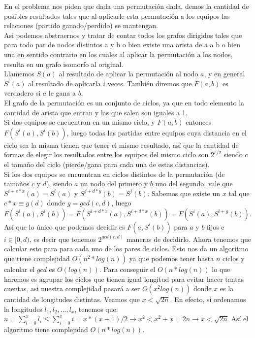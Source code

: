 \documentclass[a4paper]{article}
\begin{document}
En el problema nos piden que dada una permutaci\'on dada, demos la cantidad de posibles resultados tales que al aplicarle esta permutaci\'on a los equipos las relaciones (partido ganado/perdido) se mantengan.\\
Asi podemos abstraernos y tratar de contar todos los grafos dirigidos tales que para todo par de nodos distintos a y b o bien existe una arista de a a b o bien una en sentido contrario en los cuales al aplicar la permutaci\'on a los nodos, resulta en un grafo isomorfo al original.\\
Llamemos $S(a)$ al resultado de aplicar la permutaci\'on al nodo $a$, y en general $S^i(a)$ al resultado de aplicarla $i$ veces. Tambi\'en diremos que $F(a,b)$ es verdadero si $a$ le gana a $b$.\\
El grafo de la permutaci\'on es un conjunto de ciclos, ya que en todo elemento la cantidad de arista que entran y las que salen son iguales a 1.\\
Si dos equipos se encuentran en un mismo ciclo, y $F(a, b)$ entonces $F(S^i(a), S^i(b))$, luego todas las partidas entre equipos cuya distancia en el ciclo sea la misma tienen que tener el mismo resultado, as\'i que la cantidad de formas de elegir los resultados entre los equipos del mismo ciclo son $2^{c/2}$ siendo $c$ el tama\~no del ciclo (pierde/gana para cada una de estas distancias).\\
Si los dos equipos se encuentran en ciclos distintos de la permutaci\'on (de tama\~nos $c$ y $d$), siendo $a$ un nodo del primero y $b$ uno del segundo, vale que $S^{i+c*x}(a) = S^i(a)$ y $S^{j+d*y}(b) = S^j(b)$. Sabemos que existe un $x$ tal que $c*x \equiv g (d)$ donde $g = gcd(c,d)$, luego $F(S^i(a), S^i(b)) = F(S^{i+d*x}(a), S^{i+d*x}(b)) = F(S^i(a), S^{i+g}(b))$. As\'i que lo \'unico que podemos decidir es $F(a, S^i(b))$ para $a$ y $b$ fijos e $i \in [0, d)$, es decir que tenemos $2^{gcd(c,d)}$ maneras de decidirlo.
Ahora tenemos que calcular esto para para cada uno de los pares de ciclos. Esto nos da un algoritmo que tiene complejidad $O(n^2*log(n))$ ya que podemos tener hasta $n$ ciclos y calcular el $gcd$ es $O(log(n))$. Para conseguir el $O(n*log(n))$ lo que haremos es agrupar los ciclos que tienen igual longitud para evitar hacer tantas cuentas, asi nuestra complejidad pasar\'a a ser $O(x^2log(n))$ donde $x$ es la cantidad de longitudes distintas. Veamos que $x < \sqrt{2n}$. En efecto, si ordenamos la longitudes $l_{1}, l_{2}, ... , l_{x}$, tenemos que:\\
$n = \sum_{i=0}^xl_i \leq \sum_{i=0}^xi = x*(x+1)/2 \rightarrow x^2 < x^2+x = 2n \rightarrow x < \sqrt{2n}$
As\'i el algoritmo tiene complejidad $O(n*log(n)).$
\end{document}
